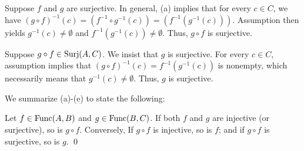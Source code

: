\documentclass[a4paper,12pt]{article}
\begin{document}
\begin{sol}
	Suppose
	\( f \)
	and
	\( g \)
	are surjective.
	In general, (a) implies that for every
	\( c \in C \),
	we have
	\( \left( g \circ f \right)^{-1}(c)
	= \left( f^{-1} \circ g^{-1}(c) \right)
	= \left( f^{-1}\left( g^{-1}(c) \right) \right)
	\).
	Assumption then yields
	\( g^{-1}(c) \neq \emptyset \)
	and
	\( f^{-1}\left( g^{-1}(c) \right) \neq \emptyset \).
	Thus, 
	\( g \circ f \)
	is surjective.
	
	Suppose \( g \circ f \in \mathrm{Surj}(A,C)\).
	We insist that \( g \) is surjective.
	For every
	\( c \in C \),
	assumption implies that 
	\( \left( g \circ f \right)^{-1}(c) = f^{-1}\left( g^{-1}(c) \right)\)
	is nonempty,
	which necessarily means that
	\( g^{-1}(c) \neq \emptyset \).
	Thus,
	\( g \) is surjective.
	
	We summarize (a)-(e) to state the following:
	\begin{thm}
		Let
		\( f \in \mathrm{Func}(A,B) \)
		and
		\( g \in \mathrm{Func}(B,C) \).
		If both
		\( f \)
		and
		\( g \)
		are injective (or surjective),
		so is
		\( g \circ f \).
		Conversely,
		If
		\( g \circ f \)
		is  injective,
		so is
		\( f \);
		and if 
		\( g \circ f \)
		is  surjective,
		so is
		\( g \).
		\qed\end{thm}\end{sol}
\end{document}
